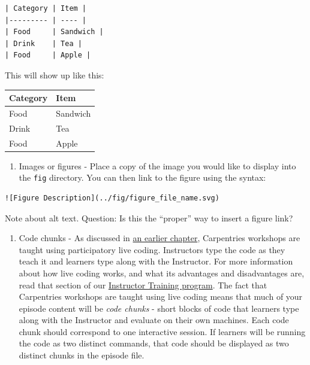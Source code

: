 \documentclass[]{book}
\providecommand{\tightlist}{%
  \setlength{\itemsep}{0pt}\setlength{\parskip}{0pt}}
\begin{document}
\begin{verbatim}
| Category | Item | 
|--------- | ---- |
| Food     | Sandwich |
| Drink    | Tea | 
| Food     | Apple |
\end{verbatim}

This will show up like this:

\begin{longtable}[]{@{}ll@{}}
\toprule
Category & Item\tabularnewline
\midrule
\endhead
Food & Sandwich\tabularnewline
Drink & Tea\tabularnewline
Food & Apple\tabularnewline
\bottomrule
\end{longtable}

\begin{enumerate}
\def\labelenumi{\arabic{enumi}.}
\tightlist
\item
  Images or figures - Place a copy of the image you would like to display into the \texttt{fig} directory. You can
  then link to the figure using the syntax:
\end{enumerate}

\begin{verbatim}
![Figure Description](../fig/figure_file_name.svg)
\end{verbatim}

Note about alt text. Question: Is this the ``proper'' way to insert a figure link?

\begin{enumerate}
\def\labelenumi{\arabic{enumi}.}
\tightlist
\item
  Code chunks - As discussed in \href{https://carpentries.github.io/curriculum-development/developing-content.html}{an earlier chapter}, Carpentries workshops are taught using participatory
  live coding. Instructors
  type the code as they teach it and learners type along with the Instructor. For more information about how
  live coding works, and what its advantages and disadvantages are, read that section of our
  \href{https://carpentries.github.io/instructor-training/14-live/index.html}{Instructor Training program}. The fact
  that Carpentries workshops are taught using live coding means that much of your episode content will be
  \emph{code chunks} - short blocks of code that learners type along with the Instructor and evaluate on their own
  machines. Each code chunk should correspond to one interactive session. If learners will be
  running the code as two distinct commands, that code should be displayed as two distinct chunks in the episode
  file.
\end{enumerate}
\end{document}
